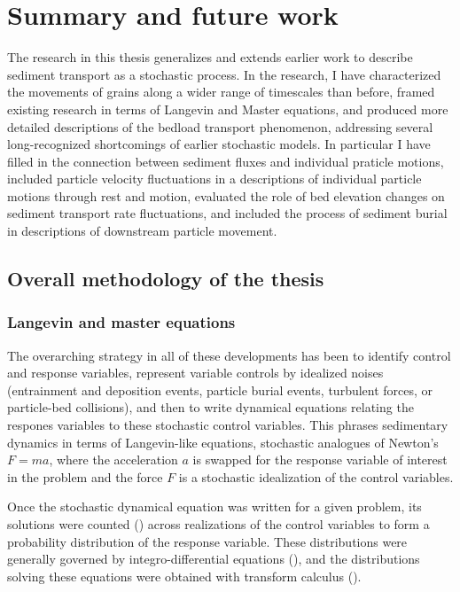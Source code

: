 
\chapter{Summary and future work}
\label{ch:conc}

The research in this thesis generalizes and extends earlier work to describe sediment transport as a stochastic process. In the research, I have characterized the movements of grains along a wider range of timescales than before, framed existing research in terms of Langevin and Master equations, and produced more detailed descriptions of the bedload transport phenomenon, addressing several long-recognized shortcomings of earlier stochastic models. In particular I have filled in the connection between sediment fluxes and individual praticle motions, included particle velocity fluctuations in a descriptions of individual particle motions through rest and motion, evaluated the role of bed elevation changes on sediment transport rate fluctuations, and included the process of sediment burial in descriptions of downstream particle movement. 

\section{Overall methodology of the thesis}

\subsection{Langevin and master equations}

The overarching strategy in all of these developments has been to identify control and response variables, represent variable controls by idealized noises (entrainment and deposition events, particle burial events, turbulent forces, or particle-bed collisions), and then to write dynamical equations relating the respones variables to these stochastic control variables.
This phrases sedimentary dynamics in terms of Langevin-like equations, stochastic analogues of Newton's $F=ma$, where the acceleration $a$ is swapped for the response variable of interest in the problem and the force $F$ is a stochastic idealization of the control variables. 

Once the stochastic dynamical equation was written for a given problem, its solutions were counted () across realizations of the control variables to form a probability distribution of the response variable. These distributions were generally governed by integro-differential equations (), and the distributions solving these equations were obtained with transform calculus (). 


